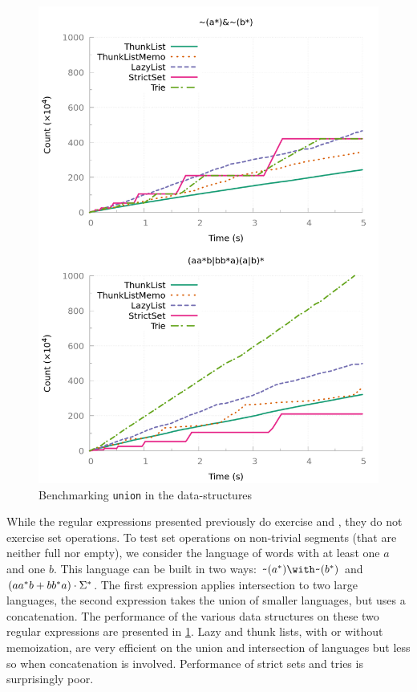 \begin{figure}[!tp]
  \includegraphics[width=\linewidth]{measure/ocaml_union.png}
  \caption{Benchmarking \texttt{union} in the \ocaml data-structures}
  \label{bench:ocaml:union}
\end{figure}

While the regular expressions presented previously do exercise
 and , they do not exercise set
operations.  To test set operations on non-trivial segments (that are
neither full nor empty), we consider the language of words with at
least one $a$ and one $b$. This language can be built in two ways:
$\Rintersect{\Rcomplement{(\Rstar{a})}}{\Rcomplement{(\Rstar{b})}}$
and $(aa^*b +{bb^*a}) \cdot{\Sigma^*}$.
The first expression applies {intersection} to two large languages,
the second expression takes the union of smaller languages, but uses a
concatenation.  The performance of the various data structures on
these two regular expressions are presented in
\cref{bench:ocaml:union}.  Lazy and thunk lists, with or without
memoization, are very efficient on the union and intersection of
languages but less so when concatenation is involved. Performance of
strict sets and tries is surprisingly poor.

